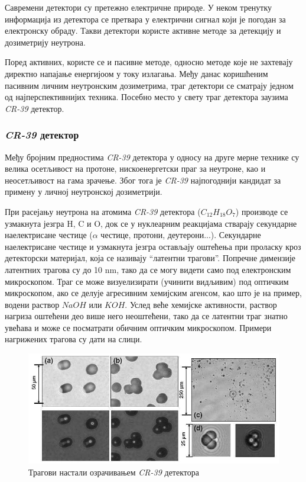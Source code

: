 \documentclass[12pt,a4paper,serbian,oneside]{book}
\begin{document}
Савремени детектори су претежно електричне природе. У неком тренутку информација из детектора се претвара у електрични сигнал који је погодан за електронску обраду. Такви детектори користе активне методе за детекцију и дозиметрију неутрона. 

Поред активних, користе се и пасивне методе, односно методе које не захтевају директно напајање енергијоом у току излагања.  Међу данас коришћеним пасивним личним неутронским дозиметрима, траг детектори се сматрају једном од најперспективнијих техника. Посебно место у свету траг детектора заузима \textit{CR-39} детектор.

\subsubsection{\textit{CR-39} детектор}

Међу бројним предностима \textit{CR-39} детектора у односу на друге мерне технике су велика осетљивост на протоне, нискоенергетски праг за неутроне, као и неосетљивост на гама зрачење. Због тога је \textit{CR-39} најпогоднији кандидат за примену у личној неутронској дозиметрији.

При расејању неутрона на атомима \textit{CR-39} детектора ($C_{12}H_{18}O_{7}$) производе се
узмакнута језгра H, C и O, док се у нуклеарним реакцијама стварају секундарне
наелектрисане честице ($\alpha$ честице, протони, деутерони...). Секундарне наелектрисане честице и узмакнута језгра остављају оштећења при проласку кроз детекторски материјал, која се називају “латентни трагови”. Попречне димензије латентних трагова су до 10 nm, тако да се могу видети само под електронским микроскопом. Траг се може визуелизирати (учинити видљивим) под оптичким микроскопом, ако се делује агресивним хемијским агенсом, као што је на пример, водени раствор $NaOH$ или $KOH$. Услед веће хемијске активности, раствор нагриза оштећени део више него неоштећени, тако да се латентни траг знатно увећава и може се посматрати обичним оптичким микроскопом. Примери нагрижених трагова су дати на слици.

\begin{figure}[h]
\begin{center}
\includegraphics[width=150mm]{images/dosimetry.png}
\end{center}
\caption{Трагови настали озрачивањем \textit{CR-39} детектора}
\label{fig:trag}
\end{figure}
\end{document}
